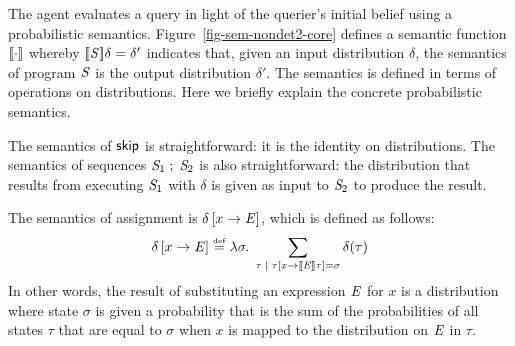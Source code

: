 The agent evaluates a query in light of the querier's initial belief
using a probabilistic semantics.  Figure~\ref{fig-sem-nondet2-core}
defines a semantic function $[\![{\cdot}]\!]{}$ whereby
$[\![{\mathit{S}}]\!]{\delta} = \delta'$ indicates that, given an input
distribution $\delta$, the semantics of program $\mathit{S}$ is the output
distribution $\delta'$.  The semantics is defined in terms of
operations on distributions.%
Here we briefly explain the concrete probabilistic semantics. 

The semantics of $\mathsf{skip}$ is straightforward: it is the identity on
distributions.  The semantics of sequences ${\mathit{S}_1} \;;\; {\mathit{S}_2}$
is also straightforward: the distribution that results from executing
$\mathit{S}_1$ with $\delta$ is given as input to $\mathit{S}_2$ to produce
the result.

The semantics of assignment is $\delta \left[ x \rightarrow \mathit{E} \right]$, which is
defined as follows: 
$$ \delta \left[ x \rightarrow \mathit{E} \right] \stackrel{\smash{\scriptscriptstyle \mathrm{def}}}= \lambda \sigma . \; \sum_{\tau \; | \; \tau
  \left[ x \rightarrow [\![{\mathit{E}}]\!]{\tau} \right] = \sigma} \delta (\tau) $$ In
other words, the result of substituting an expression $\mathit{E}$ for $x$ is a
distribution where state $\sigma$ is given a probability that is the
sum of the probabilities of all states $\tau$ that are equal to
$\sigma$ when $x$ is mapped to the distribution on $\mathit{E}$ in $\tau$.




